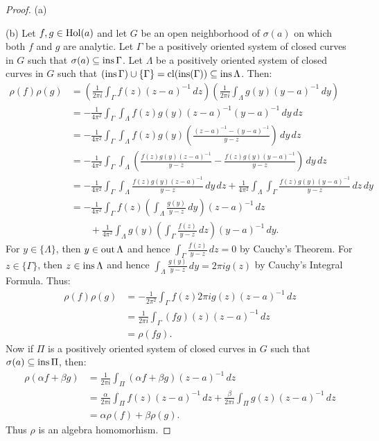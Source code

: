 	\begin{proof}
		{\color{red} (a)}

		(b) Let $f,g \in \operatorname{Hol}(a)$ and let $G$ be an open neighborhood of $\sigma(a)$ on which both $f$ and $g$ are analytic. Let $\Gamma$ be a positively oriented system of closed curves in $G$ such that $\sigma(a) \subseteq \operatorname{ins} \Gamma$. Let $\Lambda$ be a positively oriented system of closed curves in $G$ such that $(\operatorname{ins} \Gamma) \cup \{\Gamma\} = \operatorname{cl}(\operatorname{ins}(\Gamma)) \subseteq \operatorname{ins} \Lambda$. Then:
\begin{align*}
\rho(f)\rho(g)
&=
\left(\frac{1}{2\pi i}\int_{\Gamma} f(z)(z-a)^{-1}\,dz\right)
\left(\frac{1}{2\pi i}\int_{\Lambda} g(y)(y-a)^{-1}\,dy\right) \\
&=
-\frac{1}{4\pi^{2}}
\int_{\Gamma}\int_{\Lambda}
f(z)g(y)(z-a)^{-1}(y-a)^{-1}\,dy\,dz \\
&=
-\frac{1}{4\pi^{2}}
\int_{\Gamma}\int_{\Lambda}
f(z)g(y)
	\left(
\frac{(z-a)^{-1}-(y-a)^{-1}}{y-z}
\right)\,dy\,dz \\
&=
-\frac{1}{4\pi^{2}}
\int_{\Gamma}\int_{\Lambda}
\left(
\frac{f(z)g(y)(z-a)^{-1}}{y-z}
-
\frac{f(z)g(y)(y-a)^{-1}}{y-z}
\right)\,dy\,dz \\
&=
-\frac{1}{4\pi^{2}}
\int_{\Gamma}\int_{\Lambda}
\frac{f(z)g(y)(z-a)^{-1}}{y-z}\,dy\,dz
+
\frac{1}{4\pi^{2}}
\int_{\Lambda}\int_{\Gamma}
\frac{f(z)g(y)(y-a)^{-1}}{y-z}\,dz\,dy \\
&=
-\frac{1}{4\pi^{2}}
\int_{\Gamma}
f(z)
\left(
\int_{\Lambda}\frac{g(y)}{y-z}\,dy
\right)
(z-a)^{-1}\,dz \\
&\qquad
+
\frac{1}{4\pi^{2}}
\int_{\Lambda}
g(y)
\left(
\int_{\Gamma}\frac{f(z)}{y-z}\,dz
\right)
(y-a)^{-1}\,dy.
\end{align*}
		For $y \in \{\Lambda\}$, then $y \in \operatorname{out}\Lambda$ and hence $\int_{\Gamma}^{} \frac{f(z)}{y-z}\,dz = 0$ by Cauchy's Theorem. For $z \in \{\Gamma\}$, then $z \in \operatorname{ins} \Lambda$ and hence $\int_{\Lambda}^{} \frac{g(y)}{y-z}\,dy = 2\pi i g(z)$ by Cauchy's Integral Formula. Thus:
		\begin{align*}
			\rho(f) \rho(g)
			&= -\frac{1}{2\pi^2}\int_{\Gamma}^{} f(z) 2\pi i g(z)(z-a)^{-1}\,dz \\
			&= \frac{1}{2\pi i}\int_{\Gamma}^{} (fg)(z)(z-a)^{-1}\,dz \\
			&= \rho(fg).
		\end{align*}
		Now if $\Pi$ is a positively oriented system of closed curves in $G$ such that $\sigma(a) \subseteq \operatorname{ins} \Pi$, then:
		\begin{align*}
			\rho(\alpha f + \beta g)
			&= \frac{1}{2\pi i}\int_{\Pi}^{} (\alpha f + \beta g)(z-a)^{-1}\,dz \\
			&= \frac{\alpha}{2\pi i}\int_{\Pi}^{} f(z)(z-a)^{-1}\,dz + \frac{\beta}{2\pi i}\int_{\Pi}^{} g(z)(z-a)^{-1}\,dz\\
			&= \alpha \rho(f) + \beta \rho(g).
		\end{align*}
		Thus $\rho$ is an algebra homomorhism.


\end{proof}
